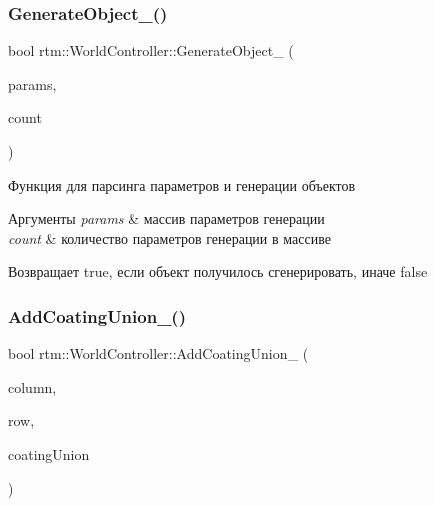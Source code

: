 \subsubsection{\texorpdfstring{Generate\+Object\+\_\+()}{GenerateObject\_()}}
{\footnotesize\ttfamily bool rtm\+::\+World\+Controller\+::\+Generate\+Object\+\_\+ (\begin{DoxyParamCaption}\item[{uint8\+\_\+t $\ast$}]{params,  }\item[{uint8\+\_\+t}]{count }\end{DoxyParamCaption})\hspace{0.3cm}{\ttfamily [private]}}

Функция для парсинга параметров и генерации объектов 
\begin{DoxyParams}{Аргументы}
{\em params} & массив параметров генерации \\
\hline
{\em count} & количество параметров генерации в массиве \\
\hline
\end{DoxyParams}
\begin{DoxyReturn}{Возвращает}
true, если объект получилось сгенерировать, иначе false 
\end{DoxyReturn}
\mbox{\label{classrtm_1_1_world_controller_a6639efb9bada52ca44f485482e7b0e70}} 
\subsubsection{\texorpdfstring{Add\+Coating\+Union\+\_\+()}{AddCoatingUnion\_()}}
{\footnotesize\ttfamily bool rtm\+::\+World\+Controller\+::\+Add\+Coating\+Union\+\_\+ (\begin{DoxyParamCaption}\item[{int}]{column,  }\item[{int}]{row,  }\item[{\hyperlink{namespacertm_a0b1daa4ff7c2591d8433d441f9e56e4c}{Coating\+Union\+Shared}}]{coating\+Union }\end{DoxyParamCaption})\hspace{0.3cm}{\ttfamily [private]}}

